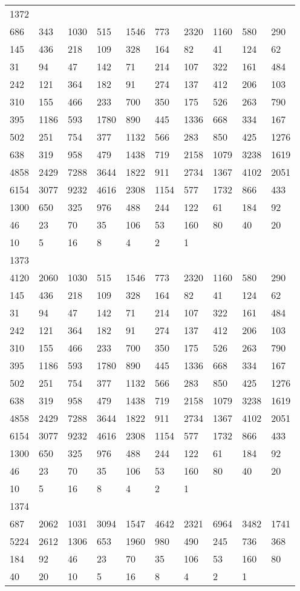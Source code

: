 \begin{longtable}{*{10}{l}}
1372&&&&&&&&&\\
686& 343& 1030& 515& 1546& 773& 2320& 1160& 580& 290\\
145& 436& 218& 109& 328& 164& 82& 41& 124& 62\\
31& 94& 47& 142& 71& 214& 107& 322& 161& 484\\
242& 121& 364& 182& 91& 274& 137& 412& 206& 103\\
310& 155& 466& 233& 700& 350& 175& 526& 263& 790\\
395& 1186& 593& 1780& 890& 445& 1336& 668& 334& 167\\
502& 251& 754& 377& 1132& 566& 283& 850& 425& 1276\\
638& 319& 958& 479& 1438& 719& 2158& 1079& 3238& 1619\\
4858& 2429& 7288& 3644& 1822& 911& 2734& 1367& 4102& 2051\\
6154& 3077& 9232& 4616& 2308& 1154& 577& 1732& 866& 433\\
1300& 650& 325& 976& 488& 244& 122& 61& 184& 92\\
46& 23& 70& 35& 106& 53& 160& 80& 40& 20\\
10& 5& 16& 8& 4& 2& 1& \\

1373&&&&&&&&&\\
4120& 2060& 1030& 515& 1546& 773& 2320& 1160& 580& 290\\
145& 436& 218& 109& 328& 164& 82& 41& 124& 62\\
31& 94& 47& 142& 71& 214& 107& 322& 161& 484\\
242& 121& 364& 182& 91& 274& 137& 412& 206& 103\\
310& 155& 466& 233& 700& 350& 175& 526& 263& 790\\
395& 1186& 593& 1780& 890& 445& 1336& 668& 334& 167\\
502& 251& 754& 377& 1132& 566& 283& 850& 425& 1276\\
638& 319& 958& 479& 1438& 719& 2158& 1079& 3238& 1619\\
4858& 2429& 7288& 3644& 1822& 911& 2734& 1367& 4102& 2051\\
6154& 3077& 9232& 4616& 2308& 1154& 577& 1732& 866& 433\\
1300& 650& 325& 976& 488& 244& 122& 61& 184& 92\\
46& 23& 70& 35& 106& 53& 160& 80& 40& 20\\
10& 5& 16& 8& 4& 2& 1& \\

1374&&&&&&&&&\\
687& 2062& 1031& 3094& 1547& 4642& 2321& 6964& 3482& 1741\\
5224& 2612& 1306& 653& 1960& 980& 490& 245& 736& 368\\
184& 92& 46& 23& 70& 35& 106& 53& 160& 80\\
40& 20& 10& 5& 16& 8& 4& 2& 1& \\


\end{longtable}
